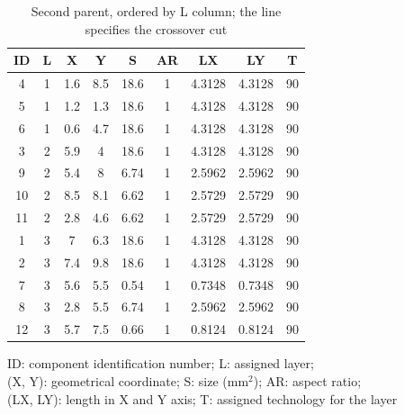 \begin{table}[h!]
\caption{Second parent, ordered by L column; the line specifies the crossover cut}
\begin{center}
\begin{scriptsize}
\begin{tabular}{|c|c|c|c|c|c|c|c|c|}
\hline ID & L & X & Y & S & AR & LX & LY & T\\
\hline 4 & 1 & 1.6 & 8.5 & 18.6 & 1 & 4.3128 & 4.3128 & 90\\
5 & 1 & 1.2 & 1.3 & 18.6 & 1 & 4.3128 & 4.3128 & 90\\
6 & 1 & 0.6 & 4.7 & 18.6 & 1 & 4.3128 & 4.3128 & 90\\
3 & 2 & 5.9 & 4 & 18.6 & 1 & 4.3128 & 4.3128 & 90\\
9 & 2 & 5.4 & 8 & 6.74 & 1 & 2.5962 & 2.5962 & 90\\
10 & 2 & 8.5 & 8.1 & 6.62 & 1 & 2.5729 & 2.5729 & 90\\
11 & 2 & 2.8 & 4.6 & 6.62 & 1 & 2.5729 & 2.5729 & 90\\
\hline
\hline
1 & 3 & 7 & 6.3 & 18.6 & 1 & 4.3128 & 4.3128 & 90\\
2 & 3 & 7.4 & 9.8 & 18.6 & 1 & 4.3128 & 4.3128 & 90\\
7 & 3 & 5.6 & 5.5 & 0.54 & 1 & 0.7348 & 0.7348 & 90\\
8 & 3 & 2.8 & 5.5 & 6.74 & 1 & 2.5962 & 2.5962 & 90\\
12 & 3 & 5.7 & 7.5 & 0.66 & 1 & 0.8124 & 0.8124 & 90\\
\hline
\end{tabular}
\end{scriptsize}
\end{center}
\begin{center}
\begin{scriptsize}
ID: component identification number; L: assigned layer;\\
(X, Y): geometrical coordinate; S: size (mm$^2$); AR: aspect ratio;\\
(LX, LY): length in X and Y axis; T: assigned technology for the layer
\end{scriptsize}
\end{center}
\label{tab:secondparentLrow}
\end{table}

